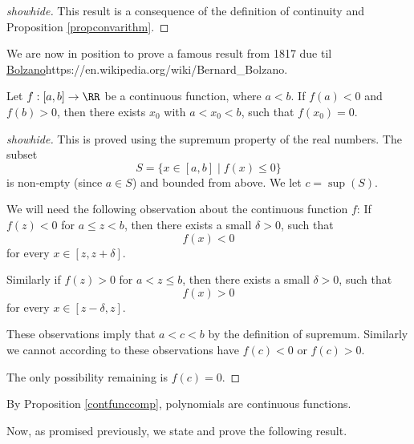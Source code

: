 \documentclass{article}
\begin{document}
\begin{proof}[showhide]
This result is a consequence of the definition of continuity and Proposition \ref{propconvarithm}.
\end{proof}


We are now in position to prove a famous result from 1817 due til \url{Bolzano}{https://en.wikipedia.org/wiki/Bernard_Bolzano}. 

\begin{theorem}\label{Bolzano}
  Let $f: [a, b]\rightarrow \RR$ be a continuous function, where $a < b$. If
  $f(a) < 0$ and $f(b) > 0$, then there exists $x_0$ with $a < x_0 < b$, such
  that $f(x_0) = 0$.
\end{theorem}

  \begin{proof}[showhide]
    This is proved using the supremum property of the real numbers. The subset
    $$
    S = \{x\in [a, b]\mid f(x) \leq 0\}
    $$
    is non-empty (since $a\in S$) and bounded from above. We let $c = \sup(S)$.

    We will need the following observation about the continuous function $f$:
    If $f(z) < 0$ for $a \leq z < b$, then there exists a small
    $\delta > 0$, such that
    $$
    f(x) < 0
    $$
    for every $x\in [z, z+\delta]$.

    Similarly if $f(z) > 0$ for $a <  z \leq b$, then there exists a small
    $\delta > 0$, such that
    $$
    f(x) > 0
    $$
    for every $x\in [z - \delta, z]$.

    These observations imply that $a < c < b$ by the definition
    of supremum. Similarly we cannot according to these
    observations have $f(c) < 0$ or $f(c) > 0$.

    The only possibility remaining is $f(c) = 0$.
  \end{proof}

By Proposition \ref{contfunccomp}, polynomials are continuous functions.

Now, as promised previously, we state and prove the following result.
\end{document}
